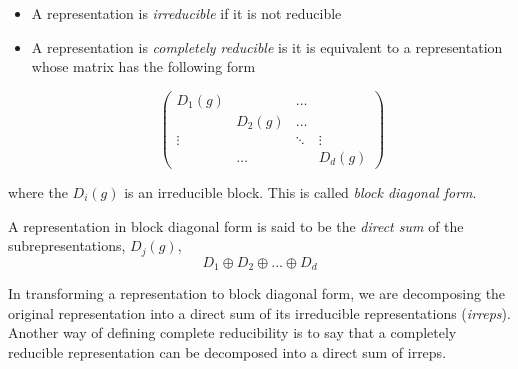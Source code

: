 \begin{itemize}
    \item A representation is \textit{irreducible} if it is not reducible
    \item A representation is \textit{completely reducible} is it is equivalent to a representation whose matrix has the following form

    \begin{equation}
        \begin{pmatrix}
            \boxed{D_1(g)} &   & \dots & \\
              & \boxed{D_2(g)} & \dots & \\
            \vdots &  &\ddots& \vdots\\ 
             & \dots & & \boxed{D_d(g)}
        \end{pmatrix}
    \end{equation}
\end{itemize}

where the $D_i(g)$ is an irreducible block. This is called \textit{block diagonal form}. 

A representation in block diagonal form is said to be the \textit{direct sum} of the subrepresentations, $D_j(g)$, 
\begin{equation}
    D_1\oplus D_2\oplus...\oplus D_d
\end{equation}

In transforming a representation to block diagonal form, we are decomposing the original representation into a direct sum of its irreducible representations (\textit{irreps}). Another way of defining complete reducibility is to say that a completely reducible representation can be decomposed into a direct sum of irreps. 


